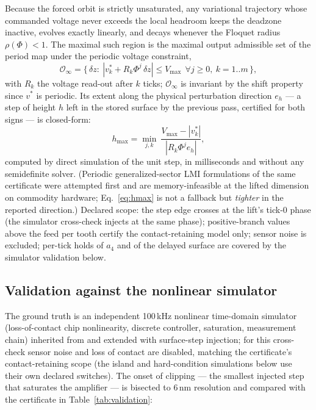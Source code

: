 \documentclass[preprint,12pt]{elsarticle}
\newcommand{\Oinf}{\ensuremath{\mathcal{O}_\infty}}
\begin{document}
Because the forced orbit is strictly unsaturated, any variational
trajectory whose commanded voltage never exceeds the local headroom
keeps the deadzone inactive, evolves exactly linearly, and decays
whenever the Floquet radius $\rho(\Phi)<1$. The maximal such region is
the maximal output admissible set \cite{gilbert1991maximal} of the
period map under the periodic voltage constraint,
\begin{equation}
\Oinf=\bigl\{\,\delta z:\ |v^*_k + R_k\Phi^j\,\delta z|\le V_{\max}
\ \ \forall j\ge0,\ k=1..m \,\bigr\},
\label{eq:oinf}
\end{equation}
with $R_k$ the voltage read-out after $k$ ticks; $\Oinf$ is invariant
by the shift property since $v^*$ is periodic. Its extent along the
physical perturbation direction $e_h$ --- a step of height $h$ left
in the stored surface by the previous pass, certified for both signs
--- is closed-form:
\begin{equation}
h_{\max}=\min_{j,k}\ \frac{V_{\max}-|v^*_k|}{|R_k\Phi^j e_h|},
\label{eq:hmax}
\end{equation}
computed by direct simulation of the unit step, in milliseconds and
without any semidefinite solver. (Periodic generalized-sector LMI
formulations of the same certificate were attempted first and are
memory-infeasible at the lifted dimension on commodity hardware;
Eq.~\eqref{eq:hmax} is not a fallback but \emph{tighter} in the
reported direction.) Declared scope: the step edge crosses at the
lift's tick-0 phase (the simulator cross-check injects at the same
phase); positive-branch values above the feed per tooth certify the
contact-retaining model only; sensor noise is excluded; per-tick
holds of $a_4$ and of the delayed surface are covered by the
simulator validation below.

\subsection{Validation against the nonlinear simulator}

The ground truth is an independent 100\,kHz nonlinear time-domain
simulator (loss-of-contact chip nonlinearity, discrete controller,
saturation, measurement chain) inherited from \cite{companion} and
extended with surface-step injection; for this cross-check sensor
noise and loss of contact are disabled, matching the certificate's
contact-retaining scope (the island and hard-condition simulations
below use their own declared switches). The onset of clipping ---
the smallest injected step that saturates the amplifier --- is
bisected to 6\,nm resolution and compared with the certificate in
Table~\ref{tab:validation}:
\end{document}

